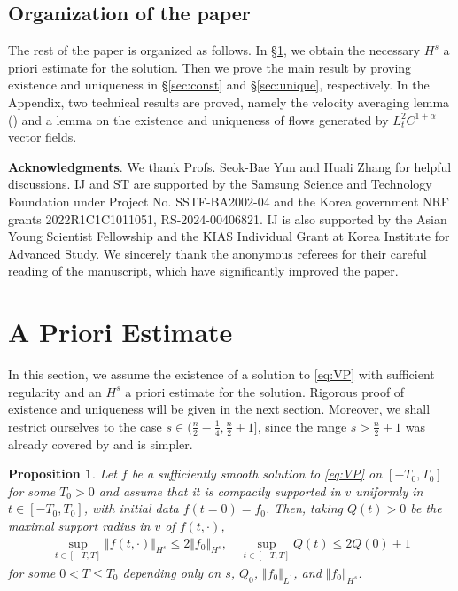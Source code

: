 \documentclass[11pt]{amsart}
\newtheorem{proposition}[theorem]{Proposition}
\theoremstyle{definition}
\theoremstyle{remark}
\numberwithin{equation}{section}
\newcommand{\nrm}[1]{\Vert#1\Vert}
\newcommand{\0}{\emptyset}
\begin{document}
	
	\subsection{Organization of the paper}
	
	The rest of the paper is organized as follows. In \S \ref{sec:apriori}, we obtain the necessary $H^{s}$ a priori estimate for the solution. Then we prove the main result by proving existence and uniqueness in \S \ref{sec:const} and \S \ref{sec:unique}, respectively.  In the Appendix, two technical results are proved, namely the velocity averaging lemma (\cite{Ago,GLPS}) and a lemma on the existence and uniqueness of flows generated by $L^2_{t}C^{1+\alpha}$ vector fields. 
	
	\bigskip
	
	\noindent \textbf{Acknowledgments}. We thank Profs. Seok-Bae Yun and Huali Zhang for helpful discussions. IJ and ST are supported by the Samsung Science and Technology Foundation under Project No. SSTF-BA2002-04 and the Korea government NRF grants 2022R1C1C1011051, RS-2024-00406821. IJ is also supported by the Asian Young Scientist Fellowship and the KIAS Individual Grant at Korea Institute for Advanced Study. {We sincerely thank the anonymous referees for their careful reading of the manuscript, which have significantly improved the paper.} 
	
	\section{A Priori Estimate}\label{sec:apriori}
	In this section, we assume the existence of a solution to \eqref{eq:VP} with sufficient regularity and an $H^{s}$ a priori estimate for the solution.   Rigorous proof of existence and uniqueness will be given in the next section. Moreover, we shall restrict ourselves to the case $s\in(\frac{n}{2}-\frac{1}{4}, \frac{n}{2}+1]$, since the range $s>\frac{n}{2}+1$ was already covered by \cite{Besov} and is simpler.
	
	\begin{proposition}\label{lem:apriori}
		Let $f$ be a sufficiently smooth solution to \eqref{eq:VP} on $[-T_{0},T_{0}]$ for some $T_{0}>0$ and assume that it is compactly supported in $v$ uniformly in $t \in [-T_{0},T_{0}]$, with initial data $f(t=0) = f_{0}$. Then, taking $Q(t) > 0$ be the maximal support radius in $v$ of $f(t,\cdot)$,  \begin{equation}\label{eq:apriori}
			\begin{split}
				\sup_{t \in [-T,T]} \nrm{f(t,\cdot)}_{H^{s}} \le 2\nrm{f_{0}}_{H^{s}}, \quad \sup_{t \in [-T,T]} Q(t) \le 2Q(0) + 1 
			\end{split}
		\end{equation} for some $0<T\le T_{0}$ depending only on $s$, $Q_{0}$, $\nrm{f_{0}}_{L^1}$, and $\nrm{f_{0}}_{H^{s}}$. 
	\end{proposition}
	
\end{document}
